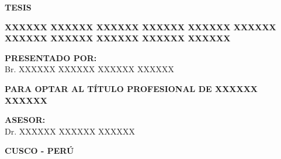 \begin{titlepage}
\begin{center}
       \textbf{TESIS}
       
       \vspace{0.3cm}
       
       \tcolorbox[
           colframe=black,
           colback=white,
           arc=3mm,
           boxrule=1pt,
           width=1\textwidth,
           halign=center,
           before=\raggedright
       ]
       \begin{center}
           {\textbf{XXXXXX XXXXXX XXXXXX XXXXXX XXXXXX XXXXXX XXXXXX XXXXXX XXXXXX XXXXXX XXXXXX} \par}
       \end{center}
       \endtcolorbox
       
       \vspace{1cm}
       
       \begin{flushright}
           \begin{minipage}{0.53\textwidth} 
               \textbf{PRESENTADO POR:}\\
               Br. XXXXXX XXXXXX XXXXXX XXXXXX
               
               \vspace{0.5cm}

               \textbf{PARA OPTAR AL TÍTULO PROFESIONAL DE XXXXXX XXXXXX}
               
               \vspace{0.5cm}
               
               \textbf{ASESOR:}\\
               Dr. XXXXXX XXXXXX XXXXXX
           \end{minipage}
       \end{flushright}
       
       \vspace{0.5cm}

       \begin{center}
            \textbf{CUSCO - PERÚ}
            \vspace{0.5cm}
            
            \textbf{\the\year}
       \end{center}
   \end{center}
\end{titlepage}